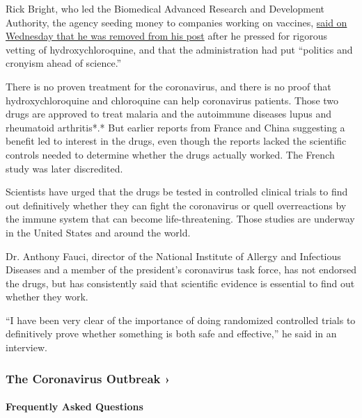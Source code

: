 Rick Bright, who led the Biomedical Advanced Research and Development
Authority, the agency seeding money to companies working on vaccines,
\href{https://www.nytimes3xbfgragh.onion/2020/04/22/us/politics/rick-bright-trump-hydroxychloroquine-coronavirus.html}{said
on Wednesday that he was removed from his post} after he pressed for
rigorous vetting of hydroxychloroquine, and that the administration had
put ``politics and cronyism ahead of science.''

There is no proven treatment for the coronavirus, and there is no proof
that hydroxychloroquine and chloroquine can help coronavirus patients.
Those two drugs are approved to treat malaria and the autoimmune
diseases lupus and rheumatoid arthritis*.* But earlier reports from
France and China suggesting a benefit led to interest in the drugs, even
though the reports lacked the scientific controls needed to determine
whether the drugs actually worked. The French study was later
discredited.

Scientists have urged that the drugs be tested in controlled clinical
trials to find out definitively whether they can fight the coronavirus
or quell overreactions by the immune system that can become
life-threatening. Those studies are underway in the United States and
around the world.

Dr. Anthony Fauci, director of the National Institute of Allergy and
Infectious Diseases and a member of the president's coronavirus task
force, has not endorsed the drugs, but has consistently said that
scientific evidence is essential to find out whether they work.

``I have been very clear of the importance of doing randomized
controlled trials to definitively prove whether something is both safe
and effective,'' he said in an interview.

\href{https://www.nytimes3xbfgragh.onion/news-event/coronavirus?action=click\&pgtype=Article\&state=default\&region=MAIN_CONTENT_3\&context=storylines_faq}{}

\hypertarget{the-coronavirus-outbreak-}{%
\subsubsection{The Coronavirus Outbreak
›}\label{the-coronavirus-outbreak-}}

\hypertarget{frequently-asked-questions}{%
\paragraph{Frequently Asked
Questions}\label{frequently-asked-questions}}

